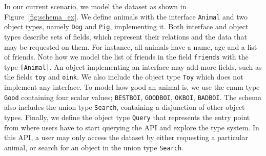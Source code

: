 In our current scenario, we model the \goodbois dataset as shown in Figure~\ref{fig:schema_ex}. 
We define animals with the interface \texttt{Animal} and two object types, namely \texttt{Dog} and \texttt{Pig}, implementing it. 
Both interface and object types describe sets of fields, which represent their relations and the data that may be requested on them. 
For instance, all animals have a name, age and a list of friends. Note how we model the list of friends in the field \texttt{friends} with the type \texttt{[Animal]}.
An object implementing an interface may add more fields, such as the fields \texttt{toy} and \texttt{oink}.
We also include the object type \texttt{Toy} which does not implement any interface. 
To model how good an animal is, we use the enum type \texttt{Good} containing four scalar values; 
\texttt{BESTBOI}, \texttt{GOODBOI}, \texttt{OKBOI}, \texttt{BADBOI}.
The schema also includes the union type \texttt{Search}, containing a disjunction of other object types.
Finally, we define the object type \texttt{Query} that represents the entry point from where users have to 
start querying the API and explore the type system. In this API, a user may only access the \goodbois dataset by 
either requesting a particular animal, or search for an object in the union type \texttt{Search}.





